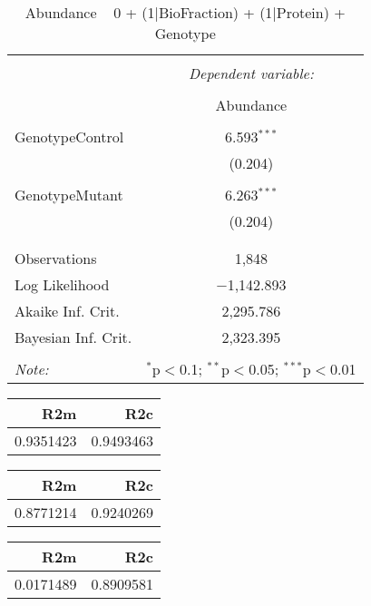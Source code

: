 \documentclass[11pt]{report}
\begin{document}
\begin{table}[!htbp] \centering 
  \caption{Abundance ~ 0 + (1|BioFraction) + (1|Protein) + Genotype} 
  \label{} 
\begin{tabular}{@{\extracolsep{5pt}}lc} 
\\[-1.8ex]\hline 
\hline \\[-1.8ex] 
 & \multicolumn{1}{c}{\textit{Dependent variable:}} \\ 
\cline{2-2} 
\\[-1.8ex] & Abundance \\ 
\hline \\[-1.8ex] 
 GenotypeControl & 6.593$^{***}$ \\ 
  & (0.204) \\ 
  & \\ 
 GenotypeMutant & 6.263$^{***}$ \\ 
  & (0.204) \\ 
  & \\ 
\hline \\[-1.8ex] 
Observations & 1,848 \\ 
Log Likelihood & $-$1,142.893 \\ 
Akaike Inf. Crit. & 2,295.786 \\ 
Bayesian Inf. Crit. & 2,323.395 \\ 
\hline 
\hline \\[-1.8ex] 
\textit{Note:}  & \multicolumn{1}{r}{$^{*}$p$<$0.1; $^{**}$p$<$0.05; $^{***}$p$<$0.01} \\ 
\end{tabular} 
\end{table} 

\begin{tabular}{r|r}
\hline
R2m & R2c\\
\hline
0.9351423 & 0.9493463\\
\hline
\end{tabular}

\begin{tabular}{r|r}
\hline
R2m & R2c\\
\hline
0.8771214 & 0.9240269\\
\hline
\end{tabular}

\begin{tabular}{r|r}
\hline
R2m & R2c\\
\hline
0.0171489 & 0.8909581\\
\hline
\end{tabular}
\end{document}
